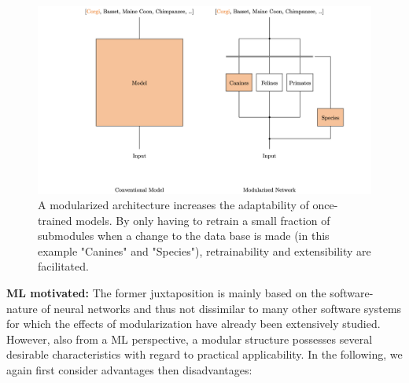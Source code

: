 \begin{figure}[bt]
    \centering
	    \includegraphics[width=\textwidth, trim=150 0 150 0, clip]{thesis/graphics/graphics/extensibility.jpeg}
    \caption{A modularized architecture increases the adaptability of once-trained models. By only having to retrain a small fraction of submodules when a change to the data base is made (in this example "Canines" and "Species"), retrainability and extensibility are facilitated.}
    \label{fig:modularization_extensibility}
\end{figure}

\textbf{ML motivated:} The former juxtaposition is mainly based on the software-nature of neural networks and thus not dissimilar to many other software systems for which the effects of modularization have already been extensively studied. However, also from a ML perspective, a modular structure possesses several desirable characteristics with regard to practical applicability. In the following, we again first consider advantages then disadvantages:


